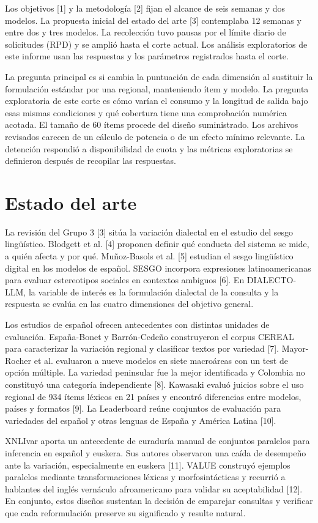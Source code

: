 \documentclass[conference]{IEEEtran}
\begin{document}
Los objetivos [1] y la metodología [2] fijan el alcance de seis semanas y dos modelos. La propuesta inicial del estado del arte [3] contemplaba 12 semanas y entre dos y tres modelos. La recolección tuvo pausas por el límite diario de solicitudes (RPD) y se amplió hasta el corte actual. Los análisis exploratorios de este informe usan las respuestas y los parámetros registrados hasta el corte.

La pregunta principal es si cambia la puntuación de cada dimensión al sustituir la formulación estándar por una regional, manteniendo ítem y modelo. La pregunta exploratoria de este corte es cómo varían el consumo y la longitud de salida bajo esas mismas condiciones y qué cobertura tiene una comprobación numérica acotada. El tamaño de 60 ítems procede del diseño suministrado. Los archivos revisados carecen de un cálculo de potencia o de un efecto mínimo relevante. La detención respondió a disponibilidad de cuota y las métricas exploratorias se definieron después de recopilar las respuestas.

\section{Estado del arte}
La revisión del Grupo 3 [3] sitúa la variación dialectal en el estudio del sesgo lingüístico. Blodgett et al. [4] proponen definir qué conducta del sistema se mide, a quién afecta y por qué. Muñoz-Basols et al. [5] estudian el sesgo lingüístico digital en los modelos de español. SESGO incorpora expresiones latinoamericanas para evaluar estereotipos sociales en contextos ambiguos [6]. En DIALECTO-LLM, la variable de interés es la formulación dialectal de la consulta y la respuesta se evalúa en las cuatro dimensiones del objetivo general.

Los estudios de español ofrecen antecedentes con distintas unidades de evaluación. España-Bonet y Barrón-Cedeño construyeron el corpus CEREAL para caracterizar la variación regional y clasificar textos por variedad [7]. Mayor-Rocher et al. evaluaron a nueve modelos en siete macroáreas con un test de opción múltiple. La variedad peninsular fue la mejor identificada y Colombia no constituyó una categoría independiente [8]. Kawasaki evaluó juicios sobre el uso regional de 934 ítems léxicos en 21 países y encontró diferencias entre modelos, países y formatos [9]. La Leaderboard reúne conjuntos de evaluación para variedades del español y otras lenguas de España y América Latina [10].

XNLIvar aporta un antecedente de curaduría manual de conjuntos paralelos para inferencia en español y euskera. Sus autores observaron una caída de desempeño ante la variación, especialmente en euskera [11]. VALUE construyó ejemplos paralelos mediante transformaciones léxicas y morfosintácticas y recurrió a hablantes del inglés vernáculo afroamericano para validar su aceptabilidad [12]. En conjunto, estos diseños sustentan la decisión de emparejar consultas y verificar que cada reformulación preserve su significado y resulte natural.
\end{document}
